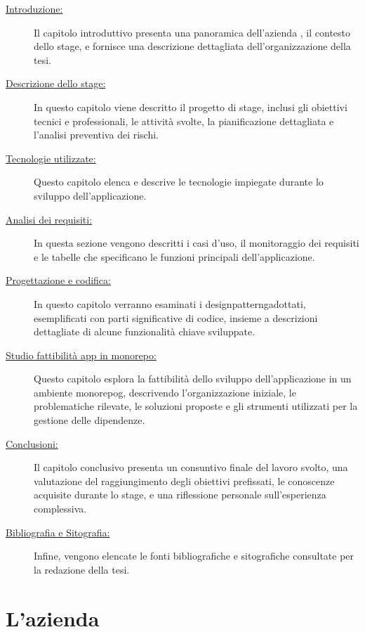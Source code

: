 \begin{description}
    \item[{\hyperref[chap:introduzione]{Introduzione:}}] Il capitolo introduttivo presenta una panoramica dell'azienda \myAzienda, il contesto dello stage, e fornisce una descrizione dettagliata dell'organizzazione della tesi.
    \item[{\hyperref[chap:stage_descrizione]{Descrizione dello stage:}}] In questo capitolo viene descritto il progetto di stage, inclusi gli obiettivi tecnici e professionali, le attività svolte, la pianificazione dettagliata e l'analisi preventiva dei rischi.
    \item[{\hyperref[chap:tecnologie_utilizzate]{Tecnologie utilizzate:}}] Questo capitolo elenca e descrive le tecnologie impiegate durante lo sviluppo dell'applicazione.
    \item[{\hyperref[chap:analisi_requisiti]{Analisi dei requisiti:}}] In questa sezione vengono descritti i casi d'uso, il monitoraggio dei requisiti e le tabelle che specificano le funzioni principali dell'applicazione.
    \item[{\hyperref[chap:design_coding]{Progettazione e codifica:}}] In questo capitolo verranno esaminati i \gls{designpatterng}\glox adottati, esemplificati con parti significative di codice, insieme a descrizioni dettagliate di alcune funzionalità chiave sviluppate.
    \item[{\hyperref[chap:studio_fattibilita]{Studio fattibilità app in monorepo:}}] Questo capitolo esplora la fattibilità dello sviluppo dell'applicazione in un ambiente \gls{monorepog}\glox, descrivendo l'organizzazione iniziale, le problematiche rilevate, le soluzioni proposte e gli strumenti utilizzati per la gestione delle dipendenze.
    \item[{\hyperref[chap:conclusioni]{Conclusioni:}}] Il capitolo conclusivo presenta un consuntivo finale del lavoro svolto, una valutazione del raggiungimento degli obiettivi prefissati, le conoscenze acquisite durante lo stage, e una riflessione personale sull'esperienza complessiva.
    \item[{\hyperref[cap:bibliography]{Bibliografia e Sitografia:}}] Infine, vengono elencate le fonti bibliografiche e sitografiche consultate per la redazione della tesi.
\end{description}
\pagebreak
\section{L'azienda}

